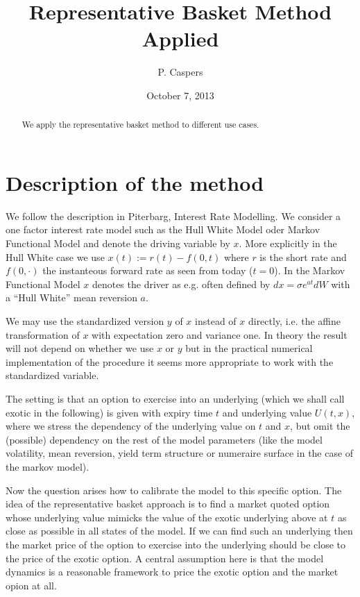\documentclass{amsart}
\theoremstyle{plain}
\numberwithin{equation}{section}
\begin{document}
\title[Representative Basket Method Applied]{Representative Basket Method Applied}
\author{P. Caspers}
\date{October 7, 2013}
\begin{abstract}
We apply the representative basket method to different use cases.
\end{abstract}

\maketitle

\section{Description of the method}

We follow the description in Piterbarg, Interest Rate Modelling.
We consider a one factor interest rate model such as the Hull White Model oder Markov Functional Model and denote
the driving variable by $x$. More explicitly in the Hull White case we use $x(t) := r(t) - f(0,t)$ where $r$
is the short rate and $f(0,\cdot)$ the instanteous forward rate as seen from today ($t=0$). In the Markov Functional
Model $x$ denotes the driver as e.g. often defined by $dx = \sigma e^{at} dW$ with a ``Hull White'' mean reversion $a$.

We may use the standardized version $y$ of $x$ instead of $x$ directly, i.e. the affine transformation of $x$ with
expectation zero and variance one. In theory the result will not depend on whether we use $x$ or $y$ but in the
practical numerical implementation of the procedure it seems more appropriate to work with the standardized variable.

The setting is that an option to exercise into an underlying (which we shall call exotic in the following) is given
with expiry time $t$ and underlying value $U(t,x)$, where we stress the dependency of the underlying value on $t$ and $x$, 
but omit the (possible) dependency on the rest of the model parameters (like the model volatility, mean reversion,  
yield term structure or numeraire surface in the case of the markov model).

Now the question arises how to calibrate the model to this specific option. The idea of the representative basket
approach is to find a market quoted option whose underlying value mimicks the value of the exotic underlying above 
at $t$ as close as possible in all states of the model. If we can find such an underlying then the market price of
the option to exercise into the underlying should be close to the price of the exotic option. A central assumption
here is that the model dynamics is a reasonable framework to price the exotic option and the market opion at all.
\end{document}
